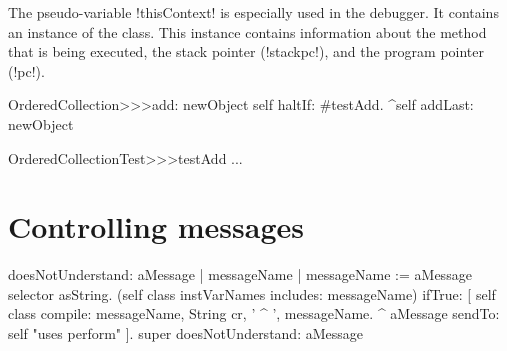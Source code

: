 \documentclass[a4paper,10pt,twoside]{book}
\begin{document}
The pseudo-variable \ct!thisContext! is especially used in the \pharo debugger.
It contains an instance of the  class.
This instance contains information about the method that is being executed, the stack pointer (\ct!stackpc!), and the program pointer (\ct!pc!).

\begin{code}{}
OrderedCollection>>>add: newObject
	self haltIf: #testAdd.
	^self addLast: newObject

OrderedCollectionTest>>>testAdd
	...

\end{code}




\section{Controlling messages}


\begin{code}{}
doesNotUnderstand: aMessage
	| messageName |
	messageName := aMessage selector asString.
	(self class instVarNames includes: messageName)
		ifTrue: [
			self class compile: messageName, String cr, ' ^ ', messageName.
			^ aMessage sendTo: self "uses perform"
			].
	super doesNotUnderstand: aMessage
\end{code}


\end{document}
